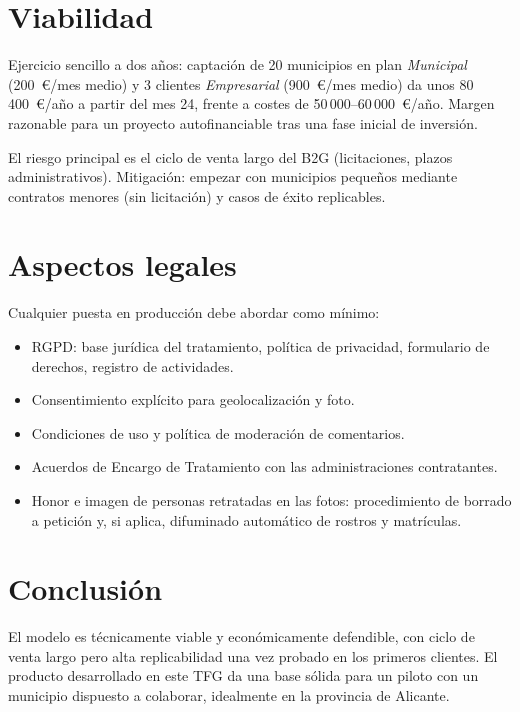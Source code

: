 \section*{Viabilidad}

Ejercicio sencillo a dos años: captación de 20 municipios en plan \textit{Municipal} (200~€/mes medio) y 3 clientes \textit{Empresarial} (900~€/mes medio) da unos 80\,400~€/año a partir del mes 24, frente a costes de 50\,000--60\,000~€/año. Margen razonable para un proyecto autofinanciable tras una fase inicial de inversión.

El riesgo principal es el ciclo de venta largo del B2G (licitaciones, plazos administrativos). Mitigación: empezar con municipios pequeños mediante contratos menores (sin licitación) y casos de éxito replicables.


\section*{Aspectos legales}

Cualquier puesta en producción debe abordar como mínimo:

\begin{itemize}[leftmargin=1.2cm, itemsep=2pt]
  \item RGPD: base jurídica del tratamiento, política de privacidad, formulario de derechos, registro de actividades.
  \item Consentimiento explícito para geolocalización y foto.
  \item Condiciones de uso y política de moderación de comentarios.
  \item Acuerdos de Encargo de Tratamiento con las administraciones contratantes.
  \item Honor e imagen de personas retratadas en las fotos: procedimiento de borrado a petición y, si aplica, difuminado automático de rostros y matrículas.
\end{itemize}


\section*{Conclusión}

El modelo es técnicamente viable y económicamente defendible, con ciclo de venta largo pero alta replicabilidad una vez probado en los primeros clientes. El producto desarrollado en este TFG da una base sólida para un piloto con un municipio dispuesto a colaborar, idealmente en la provincia de Alicante.
